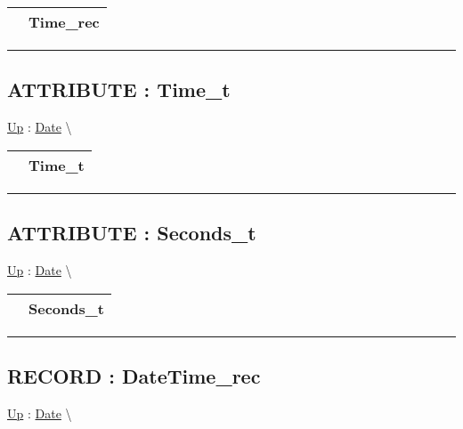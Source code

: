 {\renewcommand{\arraystretch}{1.5}
\begin{tabularx}{\textwidth}{|>{\raggedright\arraybackslash}l|X|}
\hline
\hspace{0pt} & Time\_rec \\
\hline
\end{tabularx}
}

\par


\rule{\linewidth}{0.5pt}
\subsection*{ATTRIBUTE : Time\_t}
\hypertarget{ecldoc:date.time_t}{}
\hyperlink{ecldoc:Date}{Up} :
\hspace{0pt} \hyperlink{ecldoc:Date}{Date} \textbackslash 

{\renewcommand{\arraystretch}{1.5}
\begin{tabularx}{\textwidth}{|>{\raggedright\arraybackslash}l|X|}
\hline
\hspace{0pt} & Time\_t \\
\hline
\end{tabularx}
}

\par


\rule{\linewidth}{0.5pt}
\subsection*{ATTRIBUTE : Seconds\_t}
\hypertarget{ecldoc:date.seconds_t}{}
\hyperlink{ecldoc:Date}{Up} :
\hspace{0pt} \hyperlink{ecldoc:Date}{Date} \textbackslash 

{\renewcommand{\arraystretch}{1.5}
\begin{tabularx}{\textwidth}{|>{\raggedright\arraybackslash}l|X|}
\hline
\hspace{0pt} & Seconds\_t \\
\hline
\end{tabularx}
}

\par


\rule{\linewidth}{0.5pt}
\subsection*{RECORD : DateTime\_rec}
\hypertarget{ecldoc:date.datetime_rec}{}
\hyperlink{ecldoc:Date}{Up} :
\hspace{0pt} \hyperlink{ecldoc:Date}{Date} \textbackslash 

